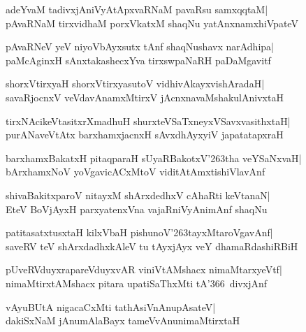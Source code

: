 \documentclass[twoside,12pt,openright]{book}
\newcounter{shloka}[chapter]
\begin{document}
\begin{shloka}%
adeYvaM tadivxjAniVyAtApxvaRNaM pavaRsu samxqqtaM|\\
pAvaRNaM tirxvidhaM porxVkatxM shaqNu yatAnxnamxhiVpateV
\end{shloka}

\begin{shloka}%
pAvaRNeV yeV niyoVbAyxsutx tAnf shaqNushavx narAdhipa|\\
paMcAginxH sAnxtakashecxYva tirxswpaNaRH paDaMgavitf
\end{shloka}

\begin{shloka}%
shorxVtirxyaH shorxVtirxyasutoV vidhivAkayxvishAradaH|\\
savaRjocnxV veVdavAnamxMtirxV jAcnxnavaMshakulAnivxtaH
\end{shloka}

\begin{shloka}%
tirxNAcikeVtasitxrXmadhuH shurxteVSaTxneyxVSavxvasithxtaH|\\
purANaveVtAtx barxhamxjacnxH sAvxdhAyxyiV japatatapxraH
\end{shloka}

\begin{shloka}%
barxhamxBakatxH pitaqparaH sUyaRBakotxV\char'263tha veYSaNxvaH|\\
bArxhamxNoV yoVgavicACxMtoV viditAtAmxtishiVlavAnf
\end{shloka}

\begin{shloka}%
shivaBakitxparoV nitayxM shArxdedhxV cAhaRti keVtanaN|\\
EteV BoVjAyxH parxyatenxVna vajaRniVyAnimAnf shaqNu
\end{shloka}

\begin{shloka}%
patitasatxtusxtaH kilxVbaH pishunoV\char'263tayxMtaroVgavAnf|\\
saveRV teV shArxdadhxkAleV tu tAyxjAyx veY dhamaRdashiRBiH                                             
\end{shloka}

\begin{shloka}%
pUveRVduyxrapareVduyxvAR viniVtAMshacx nimaMtarxyeVtf|\\
nimaMtirxtAMshacx pitara upatiSaThxMti tA\char'366\ divxjAnf
\end{shloka}

\begin{shloka}%
vAyuBUtA nigacaCxMti tathAsiVnAnupAsateV|\\
dakiSxNaM jAnumAlaBayx tameVvAnunimaMtirxtaH
\end{shloka}
\end{document}
